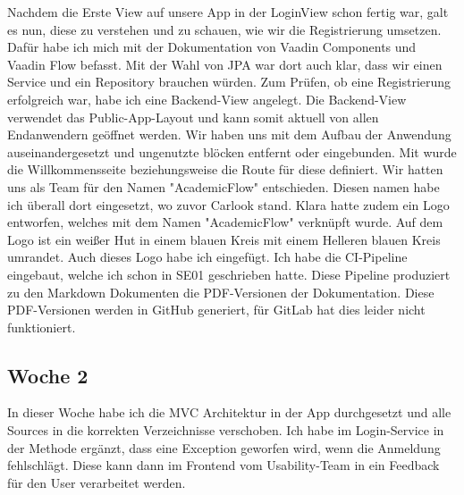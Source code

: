 Nachdem die Erste View auf unsere App in der LoginView schon fertig war, galt es nun, diese zu verstehen und zu schauen,
wie wir die Registrierung umsetzen.
Dafür habe ich mich mit der Dokumentation von Vaadin Components und Vaadin Flow befasst.
Mit der Wahl von JPA war dort auch klar, dass wir einen Service und ein Repository brauchen würden.
Zum Prüfen, ob eine Registrierung erfolgreich war, habe ich eine Backend-View angelegt.
Die Backend-View verwendet das Public-App-Layout und kann somit aktuell von allen Endanwendern
geöffnet werden.
Wir haben uns mit dem Aufbau der Anwendung auseinandergesetzt und ungenutzte blöcken entfernt oder
eingebunden.
Mit  wurde die Willkommensseite
beziehungsweise die Route für diese definiert.
Wir hatten uns als Team für den Namen "AcademicFlow" entschieden.
Diesen namen habe ich überall dort eingesetzt, wo zuvor Carlook stand.
Klara hatte zudem ein Logo entworfen, welches mit dem Namen "AcademicFlow" verknüpft wurde.
Auf dem Logo ist ein weißer Hut in einem blauen Kreis mit einem Helleren blauen
Kreis umrandet.
Auch dieses Logo habe ich eingefügt.
Ich habe die CI-Pipeline eingebaut, welche ich schon in SE01 geschrieben hatte.
Diese Pipeline produziert zu den Markdown Dokumenten die PDF-Versionen der Dokumentation.
Diese PDF-Versionen werden in GitHub generiert, für GitLab hat dies leider nicht funktioniert.

\subsection{Woche 2}\label{subsec:woche2}
In dieser Woche habe ich die MVC Architektur in der App durchgesetzt und alle Sources
in die korrekten Verzeichnisse verschoben.
Ich habe im Login-Service in der Methode  ergänzt, dass eine Exception
geworfen wird, wenn die Anmeldung fehlschlägt.
Diese kann dann im Frontend vom Usability-Team in ein Feedback für den User verarbeitet werden.



